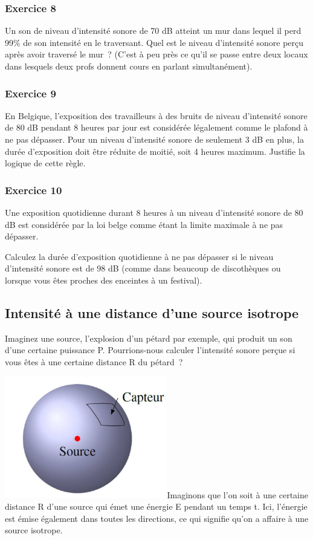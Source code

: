 \subsubsection{Exercice 8}
Un son de niveau d'intensité sonore de 70 dB atteint un mur dans
lequel il perd 99\% de son intensité en le traversant. Quel est le
niveau d'intensité sonore perçu après avoir traversé le mur~? (C'est à
peu près ce qu'il se passe entre deux locaux dans lesquels deux profs
donnent cours en parlant simultanément).

\subsubsection{Exercice 9}
En Belgique, l'exposition des travailleurs à des bruits de niveau
d'intensité sonore de 80 dB pendant 8 heures par jour est considérée
légalement comme le plafond à ne pas dépasser. Pour un niveau
d'intensité sonore de seulement 3 dB en plus, la durée d'exposition doit
être réduite de moitié, soit 4 heures maximum. Justifie la logique de
cette règle.

\subsubsection{Exercice 10}
Une exposition quotidienne durant 8 heures à un niveau d'intensité
sonore de 80 dB est considérée par la loi belge comme étant la limite
maximale à ne pas dépasser.

Calculez la durée d'exposition quotidienne à ne pas dépasser si le
niveau d'intensité sonore est de 98 dB (comme dans beaucoup de
discothèques ou lorsque vous êtes proches des enceintes à un festival).

\subsection{Intensité à une distance  d'une source isotrope }

Imaginez une source, l'explosion d'un pétard par exemple, qui produit un
son d'une certaine puissance P. Pourrions-nous calculer l'intensité
sonore perçue si vous êtes à une certaine distance R du pétard~?

\includegraphics[width=7.103cm,height=5.315cm]{Pictures/100000010000018C00000128C1F2235D9C61A7FD.png}Imaginons
que l'on soit à une certaine distance R d'une source qui émet une
énergie E pendant un temps t. Ici, l'énergie est émise également dans
toutes les directions, ce qui signifie qu'on a affaire à une source
isotrope.

